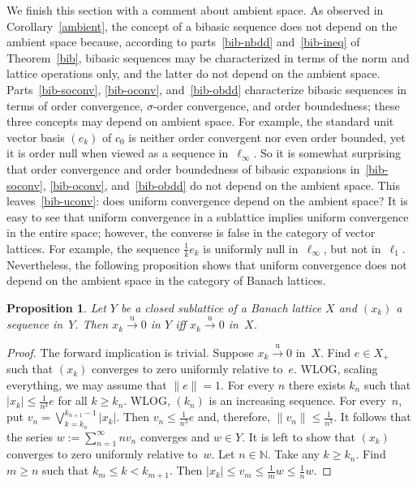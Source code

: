 \documentclass[12pt]{amsart}
\theoremstyle{plain}
\newtheorem{proposition}[theorem]{Proposition}
\theoremstyle{definition}
\newcommand{\abs}[1]{\lvert#1\rvert}
\newcommand{\norm}[1]{\lVert#1\rVert}
\newcommand{\goesu}{\xrightarrow{\mathrm{u}}} %
\renewcommand{\le}{\leqslant}
\renewcommand{\ge}{\geqslant}
\begin{document}
We finish this section with a comment about ambient space. As observed
in Corollary~\ref{ambient}, the concept of a bibasic sequence does not
depend on the ambient space because, according to
parts~\eqref{bib-nbdd} and~\eqref{bib-ineq} of Theorem~\ref{bib},
bibasic sequences may be characterized in terms of the norm and
lattice operations only, and the latter do not depend on the ambient
space. Parts~\eqref{bib-soconv}, \eqref{bib-oconv},
and~\eqref{bib-obdd} characterize bibasic sequences in terms of order
convergence, $\sigma$-order convergence, and order boundedness; these
three concepts may depend on ambient space. For example, the standard
unit vector basis $(e_k)$ of $c_0$ is neither order convergent nor
even order bounded, yet it is order null when viewed as a sequence
in~$\ell_\infty$. So it is somewhat surprising that order convergence
and order boundedness of bibasic expansions in~\eqref{bib-soconv},
\eqref{bib-oconv}, and~\eqref{bib-obdd} do not depend on the ambient
space.  This leaves~\eqref{bib-uconv}: does uniform convergence depend
on the ambient space? It is easy to see that uniform convergence in a
sublattice implies uniform convergence in the entire space; however,
the converse is false in the category of vector lattices. For example,
the sequence $\frac{1}{k}e_k$ is uniformly null in~$\ell_\infty$, but
not in~$\ell_1$. Nevertheless, the following proposition shows that
uniform convergence does not depend on the ambient space in the
category of Banach lattices.

\begin{proposition}\label{uconv-stable}
  Let $Y$ be a closed sublattice of a Banach lattice $X$ and $(x_k)$ a
  sequence in~$Y$. Then $x_k\goesu 0$ in $Y$ iff $x_k\goesu 0$ in~$X$.
\end{proposition}

\begin{proof}
  The forward implication is trivial. Suppose $x_k\goesu 0$
  in~$X$. Find $e\in X_+$ such that $(x_k)$ converges to zero
  uniformly relative to~$e$. WLOG, scaling everything, we may assume
  that $\norm{e}=1$. For every $n$ there exists $k_n$ such that
  $\abs{x_k}\le \frac{1}{n^3}e$ for all $k\ge k_n$. WLOG, $(k_n)$ is
  an increasing sequence. For every~$n$, put
  \begin{math}
    v_n=\bigvee_{k=k_n}^{k_{n+1}-1}\abs{x_k}.
  \end{math}
  Then
  $v_n\le\frac{1}{n^3}e$ and, therefore,
  $\norm{v_n}\le\frac{1}{n^3}$. It follows that the series
  $w:=\sum_{n=1}^\infty nv_n$ converges and $w\in Y$. It is left to
  show that $(x_k)$ converges to zero uniformly relative to~$w$. Let
  $n\in\mathbb N$. Take any $k\ge k_n$. Find $m\ge n$ such that
  $k_m\le k< k_{m+1}$. Then $\abs{x_k}\le
  v_m\le\frac{1}{m}w\le\frac{1}{n}w$. 
\end{proof}
\end{document}

